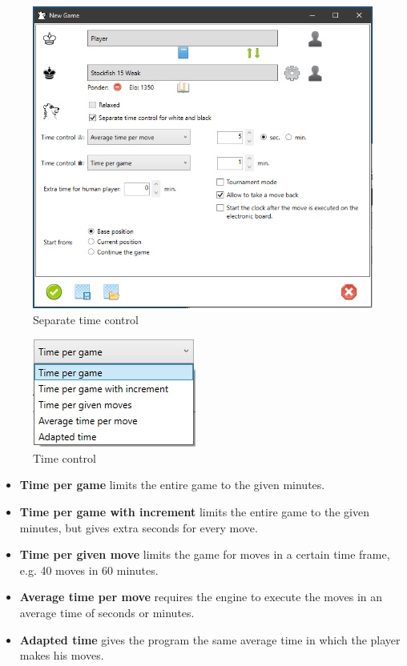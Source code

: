 \documentclass[11pt,a4paper]{article}
\begin{document}
\begin{figure}[H]
	\centering
	\includegraphics[scale=0.7]{NewGame3.png}
	\caption{Separate time control}
	\label{fig:NewGame3}
\end{figure}


\begin{figure}[H]
	\centering
	\includegraphics[scale=1.0]{TimeControl.png}
	\caption{Time control}
	\label{fig:TimeControl}
\end{figure}

\begin{itemize}
	\item \textbf{Time per game} limits the entire game to the given minutes.
	\item \textbf{Time per game with increment} limits the entire game to the given minutes, but gives extra seconds for every move.
	\item \textbf{Time per given move} limits the game for moves in a certain time frame, e.g. 40 moves in 60 minutes.
	\item \textbf{Average time per move} requires the engine to execute the moves in an average time of seconds or minutes.
	\item \textbf{Adapted time} gives the program the same average time in which the player makes his moves.	
\end{itemize}
\end{document}
